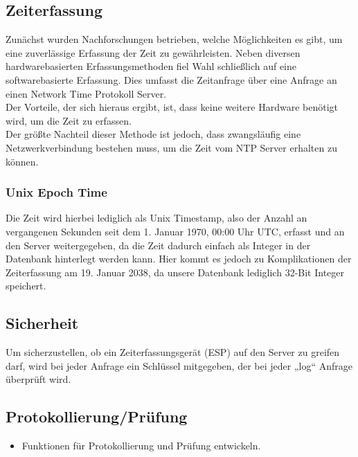 \documentclass[../main.tex]{subfiles}
\begin{document}
\subsection{Zeiterfassung} \label{ZeitwerfassungEntwicklung}
Zunächst wurden Nachforschungen betrieben, welche Möglichkeiten es gibt, um eine zuverlässige Erfassung der Zeit zu gewährleisten. Neben diversen hardwarebasierten Erfassungsmethoden fiel Wahl schließlich auf eine softwarebasierte Erfassung. Dies umfasst die Zeitanfrage über eine Anfrage an einen Network Time Protokoll Server.\\
Der Vorteile, der sich hieraus ergibt, ist, dass keine weitere Hardware benötigt wird, um die Zeit zu erfassen.\\ 
Der größte Nachteil dieser Methode ist jedoch, dass zwangsläufig eine Netzwerkverbindung bestehen muss, um die Zeit vom NTP Server erhalten zu können.
\subsubsection{Unix Epoch Time} 
Die Zeit wird hierbei lediglich als Unix Timestamp, also der Anzahl an vergangenen Sekunden seit dem 1. Januar 1970, 00:00 Uhr UTC, erfasst und an den Server weitergegeben, da die Zeit dadurch einfach als Integer in der Datenbank hinterlegt werden kann. Hier kommt es jedoch zu Komplikationen der Zeiterfassung am 19. Januar 2038, da unsere Datenbank lediglich 32-Bit Integer speichert.


\subsection{Sicherheit}

Um sicherzustellen, ob ein Zeiterfassungsgerät (ESP) auf den Server zu greifen darf, wird bei jeder Anfrage ein Schlüssel mitgegeben, der bei jeder „log“ Anfrage überprüft wird.

\subsection{Protokollierung/Prüfung}
\begin{itemize}
  \item Funktionen für Protokollierung und Prüfung entwickeln.
\end{itemize}
\end{document}
